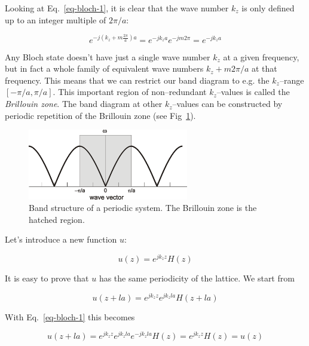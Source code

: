 Looking at Eq.~\ref{eq-bloch-1}, it is clear that the wave number $k_z$ is only defined up to an integer multiple of $2 \pi/a$:

\begin{equation}
e^{-j (k_z + m\frac{2 \pi}{a} ) a} = e^{-j k_z a} e^{-j m 2 \pi} = e^{-j k_z a}
\end{equation} 

Any Bloch state doesn't have just a single wave number $k_z$ at a given frequency, but in fact a whole family of equivalent wave numbers $k_z+m 2 \pi /a$ at that frequency. This means that we can restrict our band diagram to e.g. the $k_z$--range $[-\pi/a,\pi/a]$. This important region of non--redundant $k_z$--values is called the \emph{Brillouin zone}. The band diagram at other $k_z$--values can be constructed by periodic repetition of the Brillouin zone (see Fig~\ref{fig-band-folding}).

\begin{figure}
\centering
\includegraphics[width=7cm]{symmetry/figures/band_folding}
\caption{Band structure of a periodic system. The Brillouin zone is the hatched region.}
\label{fig-band-folding}
\end{figure}


Let's introduce a new function $u$:

\begin{equation}
u(z) = e^{j k_z z} H(z) \label{eq-bloch-u}
\end{equation} 

It is easy to prove that $u$ has the same periodicity of the lattice. We start from

\begin{equation}
u(z+la)= e^{j k_z z} e^{j k_z l a} H(z + l a)
\end{equation} 

With Eq.~\ref{eq-bloch-1} this becomes

\begin{equation}
u(z+l a)= e^{j k_z z} e^{j k_z l a} e^{-j k_z l a} H(z) = e^{j k_z z} H(z) = u(z)
\end{equation} 

